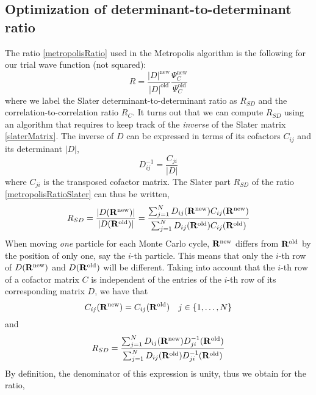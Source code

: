 \documentclass[english, a4paper]{article}
\begin{document}
\subsection{Optimization of determinant-to-determinant ratio}
The ratio \eqref{metropolisRatio} used in the Metropolis algorithm is the following 
for our trial wave function (not squared):
\begin{equation}
 R = \frac{|D|^{\textrm{new}}}{|D|^{\textrm{old}}}
 \frac{\Psi_C^{\textrm{new}}}{\Psi_C^{\textrm{old}}}
 \label{metropolisRatioSlater}
\end{equation}
where we label the Slater determinant-to-determinant ratio as $R_{SD}$ and the correlation-to-correlation
ratio $R_C$.
It turns out that we can compute $R_{SD}$ using an algorithm that requires to keep track of the \textit{inverse}
of the Slater matrix \eqref{slaterMatrix}. The inverse of $D$ can be expressed in terms of its cofactors 
$C_{ij}$ and its determinant $|D|$,
\begin{equation}
 D_{ij}^{-1} = \frac{C_{ji}}{|D|}
\end{equation}
where $C_{ji}$ is the transposed cofactor matrix. 
The Slater part $R_{SD}$ of the ratio \eqref{metropolisRatioSlater} can thus be written,
\begin{equation}
 R_{SD} = \frac{|D({\bf R}^{\textrm{new}})|}{|D({\bf R}^{\textrm{old}})|}
  = \frac{\sum_{j=1}^N D_{ij}({\bf R}^{\textrm{new}}) C_{ij}({\bf R}^{\textrm{new}})}
  {\sum_{j=1}^N D_{ij}({\bf R}^{\textrm{old}}) C_{ij}({\bf R}^{\textrm{old}})}
\end{equation}
When moving \textit{one} particle for each Monte Carlo cycle, ${\bf R}^{\textrm{new}}$ differs from 
${\bf R}^{\textrm{old}}$ by the position of only one, say the $i$-th particle. This means that
only the $i$-th row of $D({\bf R}^{\textrm{new}})$
and $D({\bf R}^{\textrm{old}})$ will be different. Taking into account that the $i$-th row of a cofactor matrix
$C$ is independent of the entries of the $i$-th row of its corresponding matrix $D$, we have that
\begin{equation}
 C_{ij}({\bf R}^{\textrm{new}}) = C_{ij}({\bf R}^{\textrm{old}}) \quad j \in \{1,\dots,N\}
\end{equation}
and
\begin{equation}
 R_{SD} = \frac{\sum_{j=1}^N D_{ij}({\bf R}^{\textrm{new}}) D_{ji}^{-1}({\bf R}^{\textrm{old}})}
  {\sum_{j=1}^N D_{ij}({\bf R}^{\textrm{old}}) D_{ji}^{-1}({\bf R}^{\textrm{old}})}
\end{equation}
By definition, the denominator of this expression is unity, thus we obtain for the ratio,
\end{document}
